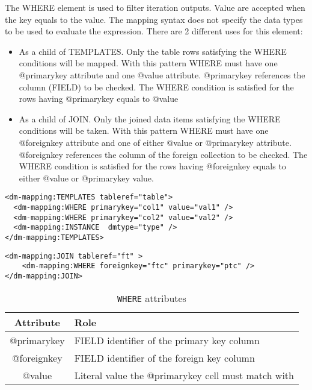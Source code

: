 The WHERE element is used to filter iteration outputs. Value are accepted when the key equals to the value. The mapping syntax does not specify the data types to be used to evaluate the expression. 
There  are 2 different uses for this element:
\begin{itemize}
    \item As a child of TEMPLATES. Only the table rows satisfying the WHERE conditions will be mapped. 
             With this pattern WHERE must have one @primarykey attribute and one @value attribute. 
              @primarykey references the column (FIELD) to be checked. 
             The WHERE condition is satisfied for the rows having @primarykey equals to @value
    \item As a child of JOIN. Only the joined data items satisfying the WHERE conditions will be taken. 
             With this pattern WHERE must have one @foreignkey attribute and one of either @value or @primarykey attribute. 
              @foreignkey references the column of the foreign collection to be checked. 
             The WHERE condition is satisfied for the rows having @foreignkey equals to either @value or @primarykey value.
\end{itemize}

\begin{lstlisting}[frame=single,caption={\texttt{WHERE} Example: only rows having val1 as col1 value and  val2 as col2 value are mapped},style=XML,basicstyle=\tiny]
<dm-mapping:TEMPLATES tableref="table">
  <dm-mapping:WHERE primarykey="col1" value="val1" />
  <dm-mapping:WHERE primarykey="col2" value="val2" />
  <dm-mapping:INSTANCE  dmtype="type" />
</dm-mapping:TEMPLATES>
\end{lstlisting}

\begin{lstlisting}[frame=single,caption={\texttt{WHERE} Example: the join is satisfied when the value of the ptc column  is equals to the ftc column of the foreign table },style=XML,basicstyle=\tiny]
<dm-mapping:JOIN tableref="ft" >
	<dm-mapping:WHERE foreignkey="ftc" primarykey="ptc" />
</dm-mapping:JOIN>
\end{lstlisting}

\begin{table}[!htbp]
\small
\centering
\begin{tabulary}{\linewidth}{|c|J|}       
       \hline 
            \textbf{Attribute} & 
            \textbf {Role}\\
       \hline         \hline  
            @primarykey& 
            FIELD identifier of the primary key column \\
        \hline 
            @foreignkey & 
            FIELD identifier of the foreign key column \\
        \hline 
            @value & 
            Literal value the  @primarykey cell must match with\\
        \hline 
     \end{tabulary}
     \caption{\texttt{WHERE} attributes} 
     \label{tbl:where-att}
 \end{table}

